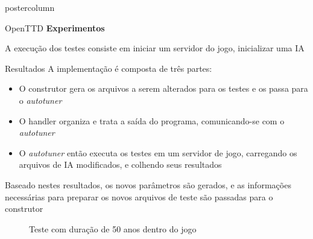 \documentclass[final]{beamer}
\begin{document}
\begin{frame}
\begin{columns}
\begin{column}{.5\textwidth}
\begin{beamercolorbox}[center,wd=\textwidth]{postercolumn}
\begin{minipage}[T]{.95\textwidth}
{\begin{block}{OpenTTD}
                \textbf{Experimentos}
                
                \vspace*{0.2cm}
                A execução dos testes consiste em iniciar um servidor do jogo, inicializar uma IA
                
                \vspace*{0.5cm} 
            \end{block}

            \vspace*{0.2cm} 
            
            \begin{block}{Resultados}
              \justifying 
                A implementação é composta de três partes:
                \begin{itemize}
                	\item O construtor gera os arquivos a serem alterados para os testes e os passa para o \textit{autotuner}
                	\item O handler organiza e trata a saída do programa, comunicando-se com o \textit{autotuner}
                	\item O \textit{autotuner} então executa os testes em um servidor de jogo, carregando os arquivos de IA modificados, e colhendo seus resultados	
                \end{itemize}
                
                Baseado nestes resultados, os novos parâmetros são gerados, e as informações necessárias para preparar os novos arquivos de teste são passadas para o construtor

                \begin{figure}[htp]
                  \centering
                  \caption{Teste com duração de 50 anos dentro do jogo}
                \end{figure}
                

\end{block}}
\end{minipage}
\end{beamercolorbox}
\end{column}
\end{columns}
\end{frame}
\end{document}
